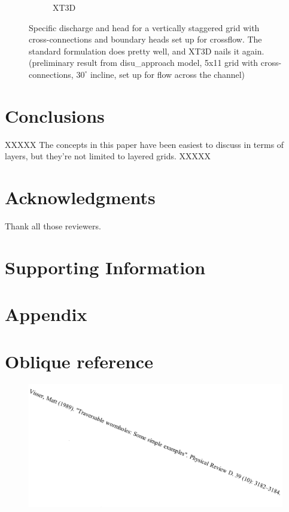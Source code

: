 \documentclass{article}
\begin{document}
\begin{figure}[H]
\begin{subfigure}{0.4\textwidth}
	\caption{XT3D}
	\label{fig:disu-x-cc-cf-head}
\end{subfigure}
\caption{Specific discharge and head for a vertically staggered grid with cross-connections and boundary heads set up for crossflow. The standard formulation does pretty well, and XT3D nails it again. (preliminary result from disu\_approach model, 5x11 grid with cross-connections, $30^{\circ}$ incline, set up for flow across the channel)}
\label{fig:figures}
\end{figure}

\section{Conclusions}

XXXXX The concepts in this paper have been easiest to discuss in terms of layers, but they're not limited to layered grids. XXXXX

\section{Acknowledgments}
Thank all those reviewers.

\section{Supporting Information}

\section{Appendix}



\section{Oblique reference}

\begin{figure}[H]
	\includegraphics[scale=0.5]{../figures/oblique_reference.png}
\end{figure}
\end{document}
